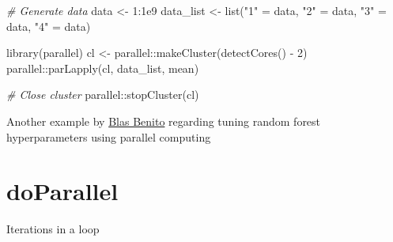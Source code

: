 \documentclass[
]{book}
\newenvironment{Shaded}{\begin{snugshade}}{\end{snugshade}}
\newcommand{\CommentTok}[1]{\textcolor[rgb]{0.56,0.35,0.01}{\textit{#1}}}
\newcommand{\DecValTok}[1]{\textcolor[rgb]{0.00,0.00,0.81}{#1}}
\newcommand{\FloatTok}[1]{\textcolor[rgb]{0.00,0.00,0.81}{#1}}
\newcommand{\FunctionTok}[1]{\textcolor[rgb]{0.00,0.00,0.00}{#1}}
\newcommand{\NormalTok}[1]{#1}
\newcommand{\OtherTok}[1]{\textcolor[rgb]{0.56,0.35,0.01}{#1}}
\newcommand{\SpecialCharTok}[1]{\textcolor[rgb]{0.00,0.00,0.00}{#1}}
\newcommand{\StringTok}[1]{\textcolor[rgb]{0.31,0.60,0.02}{#1}}
\begin{document}
\begin{Shaded}
\begin{Highlighting}[]
\CommentTok{\# Generate data}
\NormalTok{data }\OtherTok{\textless{}{-}} \DecValTok{1}\SpecialCharTok{:}\FloatTok{1e9}
\NormalTok{data\_list }\OtherTok{\textless{}{-}} \FunctionTok{list}\NormalTok{(}\StringTok{"1"} \OtherTok{=}\NormalTok{ data,}
                  \StringTok{"2"} \OtherTok{=}\NormalTok{ data,}
                  \StringTok{"3"} \OtherTok{=}\NormalTok{ data,}
                  \StringTok{"4"} \OtherTok{=}\NormalTok{ data)}


\FunctionTok{library}\NormalTok{(parallel)}
\NormalTok{cl }\OtherTok{\textless{}{-}}\NormalTok{ parallel}\SpecialCharTok{::}\FunctionTok{makeCluster}\NormalTok{(}\FunctionTok{detectCores}\NormalTok{() }\SpecialCharTok{{-}} \DecValTok{2}\NormalTok{)}
\NormalTok{parallel}\SpecialCharTok{::}\FunctionTok{parLapply}\NormalTok{(cl,}
\NormalTok{                    data\_list,}
\NormalTok{                    mean)}

\CommentTok{\# Close cluster}
\NormalTok{parallel}\SpecialCharTok{::}\FunctionTok{stopCluster}\NormalTok{(cl)}
\end{Highlighting}
\end{Shaded}

Another example by \href{https://www.blasbenito.com/post/02_parallelizing_loops_with_r/}{Blas Benito} regarding tuning random forest hyperparameters using parallel computing

\hypertarget{doparallel}{%
\section{doParallel}\label{doparallel}}

Iterations in a loop
\end{document}
